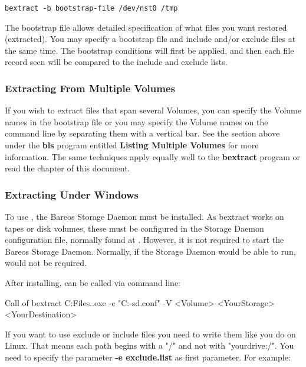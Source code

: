 \footnotesize
\begin{verbatim}
bextract -b bootstrap-file /dev/nst0 /tmp
\end{verbatim}
\normalsize

The bootstrap file allows detailed specification of what files you want
restored (extracted). You may specify a bootstrap file and include and/or
exclude files at the same time. The bootstrap conditions will first be
applied, and then each file record seen will be compared to the include and
exclude lists.

\subsubsection{Extracting From Multiple Volumes}

If you wish to extract files that span several Volumes, you can specify the
Volume names in the bootstrap file or you may specify the Volume names on the
command line by separating them with a vertical bar. See the section above
under the {\bf bls} program entitled {\bf Listing Multiple Volumes} for more
information. The same techniques apply equally well to the {\bf bextract}
program or read the 
chapter of this document.

\subsubsection{Extracting Under Windows}


To use , the Bareos Storage Daemon must be installed.
As bextract works on tapes or disk volumes, these must be configured in the Storage Daemon configuration file,
normally found at .
However, it is not required to start the Bareos Storage Daemon.
Normally, if the Storage Daemon would be able to run,  would not be required.

After installing,  can be called via command line:

\begin{commands}{Call of bextract}
C:\Program Files\Bareos .\bextract.exe -c "C:\ProgrammData\Bareos\bareos-sd.conf" -V <Volume> <YourStorage> <YourDestination>
\end{commands}

If you want to use exclude or include files you need to write them like you do on Linux. That means each path begins with
a "/" and not with "yourdrive:/". You need to specify the parameter {\bf -e exclude.list} as first parameter.
For example:

